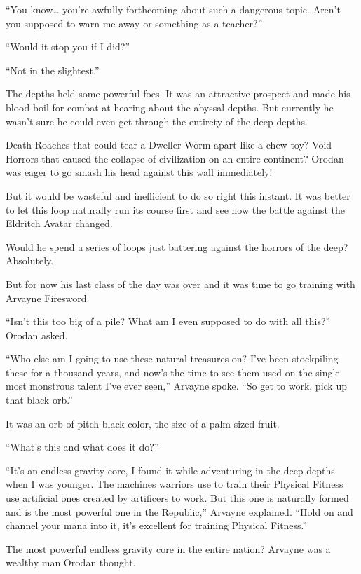 \documentclass[a4paper,10pt]{book}
\begin{document}
“You know… you’re awfully forthcoming about such a dangerous topic. Aren’t you supposed to warn me away or something as a teacher?”\par
“Would it stop you if I did?”\par
“Not in the slightest.”\par
The depths held some powerful foes. It was an attractive prospect and made his blood boil for combat at hearing about the abyssal depths. But currently he wasn’t sure he could even get through the entirety of the deep depths.\par
Death Roaches that could tear a Dweller Worm apart like a chew toy? Void Horrors that caused the collapse of civilization on an entire continent? Orodan was eager to go smash his head against this wall immediately!\par
But it would be wasteful and inefficient to do so right this instant. It was better to let this loop naturally run its course first and see how the battle against the Eldritch Avatar changed.\par
Would he spend a series of loops just battering against the horrors of the deep? Absolutely.\par
But for now his last class of the day was over and it was time to go training with Arvayne Firesword.\par
\par
“Isn’t this too big of a pile? What am I even supposed to do with all this?” Orodan asked.\par
“Who else am I going to use these natural treasures on? I’ve been stockpiling these for a thousand years, and now’s the time to see them used on the single most monstrous talent I’ve ever seen,” Arvayne spoke. “So get to work, pick up that black orb.”\par
It was an orb of pitch black color, the size of a palm sized fruit.\par
“What’s this and what does it do?”\par
“It’s an endless gravity core, I found it while adventuring in the deep depths when I was younger. The machines warriors use to train their Physical Fitness use artificial ones created by artificers to work. But this one is naturally formed and is the most powerful one in the Republic,” Arvayne explained. “Hold on and channel your mana into it, it’s excellent for training Physical Fitness.”\par
The most powerful endless gravity core in the entire nation? Arvayne was a wealthy man Orodan thought.\par
\end{document}
